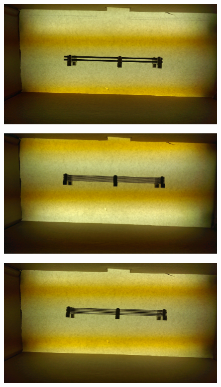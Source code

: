 \documentclass[10pt]{scrartcl}
\begin{document}
\begin{figure}[!ht]
    \centering
    \includegraphics[width=\textwidth]{../plots_tables_images/slats/IMAG0137_BURST010.jpg}\caption{}
\end{figure}
\begin{figure}[!ht]
    \centering
    \includegraphics[width=\textwidth]{../plots_tables_images/slats/IMAG0122.jpg}    
    \caption{}
\end{figure}
\begin{figure}[!ht]
    \centering
    \includegraphics[width=\textwidth]{../plots_tables_images/slats/IMAG0128.jpg}
    \caption{}
\end{figure}
\end{document}
